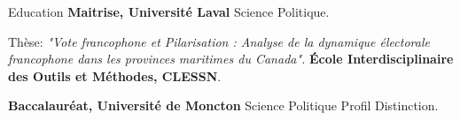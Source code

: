 \begin{rubric}{Education}
\entry*[2024 -- 2026]%
	\textbf{Maitrise, Université Laval} Science Politique.
	\par Thèse: \emph{"Vote francophone et Pilarisation : Analyse de la dynamique électorale francophone dans les provinces maritimes du Canada".}
%
\entry*[2024]%
	\textbf{École Interdisciplinaire des Outils et Méthodes, CLESSN}.\par
\entry*[2020 -- 2024]%
	\textbf{Baccalauréat, Université de Moncton} Science Politique Profil Distinction.\par    
\end{rubric}